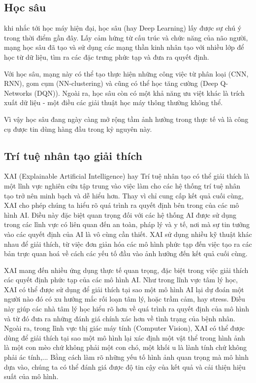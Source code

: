 \subsection{Học sâu}
khi nhắc tới học máy hiện đại, học sâu (hay Deep Learning) lấy được sự chú ý trong thời điểm gần đây. Lấy cảm hứng từ cấu trúc và chức năng của não người, mạng học sâu đã tạo và sử dụng các mạng thần kinh nhân tạo với nhiều lớp để học từ dữ liệu, tìm ra các đặc trưng phức tạp và đưa ra quyết định.

Với học sâu, mạng này có thể tạo thực hiện những công việc từ phân loại (CNN, RNN), gom cụm (NN-clustering) và cũng có thể học tăng cường (Deep Q-Networks (DQN)). Ngoài ra, học sâu còn có một khả năng ưu việt khác là trích xuất dữ liệu - một điều các giải thuật học máy thông thường không thể.

Vì vậy học sâu đang ngày càng mở rộng tầm ảnh hưởng trong thực tế và là công cụ được tin dùng hàng đầu trong kỷ nguyên này.

\subsection{Trí tuệ nhân tạo giải thích}
XAI (Explainable Artificial Intelligence) hay Trí tuệ nhân tạo có thể giải thích là một lĩnh vực nghiên cứu tập trung vào việc làm cho các hệ thống trí tuệ nhân tạo trở nên minh bạch và dễ hiểu hơn. Thay vì chỉ cung cấp kết quả cuối cùng, XAI cho phép chúng ta hiểu rõ quá trình ra quyết định bên trong của các mô hình AI. Điều này đặc biệt quan trọng đối với các hệ thống AI được sử dụng trong các lĩnh vực có liên quan đến an toàn, pháp lý và y tế, nơi mà sự tin tưởng vào các quyết định của AI là vô cùng cần thiết. XAI sử dụng nhiều kỹ thuật khác nhau để giải thích, từ việc đơn giản hóa các mô hình phức tạp đến việc tạo ra các bản trực quan hoá về cách các yếu tố đầu vào ảnh hưởng đến kết quả cuối cùng.

XAI mang đến nhiều ứng dụng thực tế quan trọng, đặc biệt trong việc giải thích các quyết định phức tạp của các mô hình AI. Như trong lĩnh vực tâm lý học, XAI có thể được sử dụng để giải thích tại sao một mô hình AI lại dự đoán một người nào đó có xu hướng mắc rối loạn tâm lý, hoặc trầm cảm, hay stress. Điều này giúp các nhà tâm lý học hiểu rõ hơn về quá trình ra quyết định của mô hình và từ đó đưa ra những đánh giá chính xác hơn về tình trạng của bệnh nhân. Ngoài ra, trong lĩnh vực thị giác máy tính (Computer Vision), XAI có thể được dùng để giải thích tại sao một mô hình lại xác định một vật thể trong hình ảnh là một con mèo chứ không phải một con chó, một khối u là lành tính chứ không phải ác tính,... Bằng cách làm rõ những yếu tố hình ảnh quan trọng mà mô hình dựa vào, chúng ta có thể đánh giá được độ tin cậy của kết quả và cải thiện hiệu suất của mô hình.

